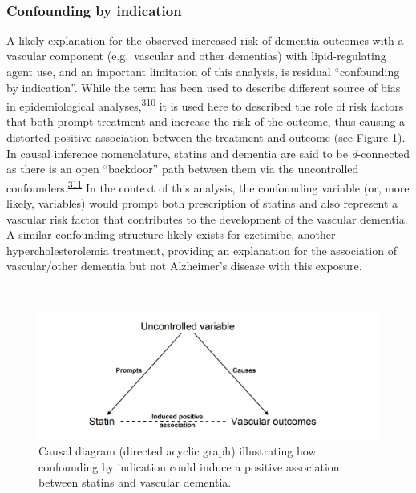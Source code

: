 \documentclass[a4paper, twoside]{templates/ociamthesis}
\begin{document}
~

\hypertarget{cprd-confounding-by-ind}{%
\subsubsection{Confounding by indication}\label{cprd-confounding-by-ind}}

A likely explanation for the observed increased risk of dementia outcomes with a vascular component (e.g.~vascular and other dementias) with lipid-regulating agent use, and an important limitation of this analysis, is residual ``confounding by indication''. While the term has been used to describe different source of bias in epidemiological analyses,\textsuperscript{\protect\hyperlink{ref-salas1999}{310}} it is used here to described the role of risk factors that both prompt treatment and increase the risk of the outcome, thus causing a distorted positive association between the treatment and outcome (see Figure \ref{fig:indicationBias}). In causal inference nomenclature, statins and dementia are said to be \emph{d}-connected as there is an open ``backdoor'' path between them via the uncontrolled confounders.\textsuperscript{\protect\hyperlink{ref-suttorp2015}{311}} In the context of this analysis, the confounding variable (or, more likely, variables) would prompt both prescription of statins and also represent a vascular risk factor that contributes to the development of the vascular dementia. A similar confounding structure likely exists for ezetimibe, another hypercholesterolemia treatment, providing an explanation for the association of vascular/other dementia but not Alzheimer's disease with this exposure.

~\\




\begin{figure}[H]

{\centering \includegraphics[width=0.8\linewidth]{figures/cprd-analysis/indicationBias} 

}

\caption[Confounding by indication causal diagram]{Causal diagram (directed acyclic graph) illustrating how confounding by indication could induce a positive association between statins and vascular dementia.}\label{fig:indicationBias}
\end{figure}
\end{document}
